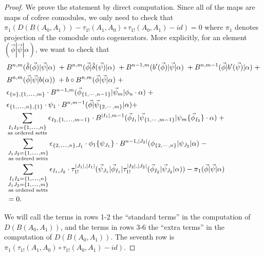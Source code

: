 \begin{proof}
We prove the statement by direct computation. 
Since all of the maps are maps of cofree comodules, 
we only need to check that $\pi_1(D(B(A_0,A_1)) - 
\tau_{1!}(A_1,A_0)\circ \tau_{1!}(A_0,A_1) - id) = 0$ 
where $\pi_1$ denotes projection of the comodule 
onto cogenerators. More explicitly, for an element 
$(\vec{\phi}|\vec{\psi}|\alpha)$, we want to check that
\begin{equation} \label{eq:upsilon_homotopy}
\begin{aligned}
&B^{n,m} ( \tilde{\delta}(\vec{\phi}) | \vec{\psi} | \alpha ) \; + 
B^{n,m} ( \vec{\phi} | \tilde{\delta}(\vec{\psi}) | \alpha ) \; + 
B^{n-1,m} ( b^\prime(\vec{\phi}) | \vec{\psi} | \alpha ) \; + 
B^{n,m-1} ( \vec{\phi} | b^\prime(\vec{\psi}) | \alpha ) \; + \\
&B^{n,m} ( \vec{\phi} | \vec{\psi} | b(\alpha) ) \; + 
b \circ B^{n,m} ( \vec{\phi} | \vec{\psi} | \alpha ) \; + \\
%
& \epsilon_{\{n\},\{1,\smdots,m\}}\cdot
B^{n-1,m}(\vec{\phi}_{\{1,\cdots, n-1\}} |\vec{\psi}_{m} | \phi_{n} \cdot \alpha) \; + \\
%
& \epsilon_{\{1,\smdots,n\},\{1\}}\cdot
\psi_1 \cdot B^{n,m-1} ( \vec{\phi} | \vec{\psi}_{\{2,\cdots, m\}} | \alpha)  + \\ 
%
& \sum \limits_{\substack{
    I_1I_2 = \{1,\smdots,n\}\\
    \textrm{as ordered setts}}}
\epsilon_{I_2,\{1,\smdots,m-1\}}\cdot
B^{|I_1|,m-1}(\vec{\phi}_{I_1} | \vec{\psi}_{\{1,\cdots, m-1\}} | \psi_{m} \{\vec{\phi}_{I_2}\}\cdot \alpha ) \; + \\
%
& \sum \limits_{\substack{
    J_1J_2 = \{1,\smdots,m\}\\
    \textrm{as ordered setts}}}
\epsilon_{\{2,\smdots,n\},J_1}\cdot
\phi_1 \{ \psi_{J_1}\} \cdot B^{n-1,|J_2|}(\phi_{\{2,\cdots , n\}} | \psi_{J_2} | \alpha ) \; - \\
%
& \sum \limits_{\substack{
    I_1I_2 = \{1,\smdots,n\}\\
    J_1J_2 = \{1,\smdots,m\}\\
    \textrm{as ordered setts}}}
\epsilon_{I_1,J_2}\cdot
\tau_{1!}^{|J_1|,|I_1|} (\vec{\psi}_{J_1} | \vec{\phi}_{I_1} | \tau_{1!}^{|I_2|,|J_2|} (\vec{\phi}_{I_2} | \vec{\psi}_{J_2} | \alpha ))  - \pi_1(\vec{\phi} | \vec{\psi} | \alpha) \\
&= 0.
\end{aligned}
\end{equation}

We will call the terms in rows 1-2 the ``standard terms'' in the computation of $D(B(A_0,A_1))$, and the terms in rows 3-6 the ``extra terms'' in the computation of $D(B(A_0,A_1))$. The seventh row is $\pi_1(\tau_{1!}(A_1,A_0)\circ \tau_{1!}(A_0,A_1) - id)$. 


\end{proof}
